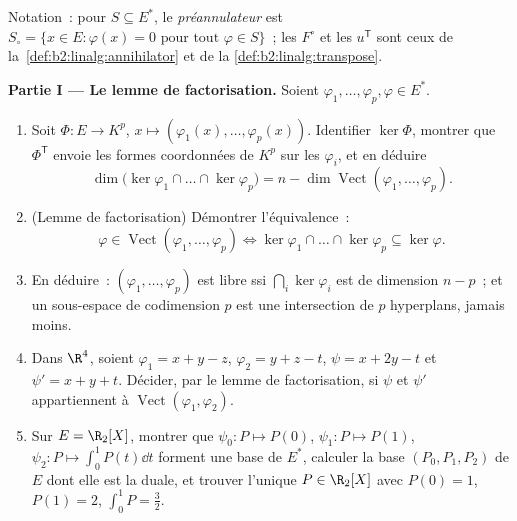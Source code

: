 \begin{problem}
\label{pb:b2:linalg:1}
Notation~: pour $S \subseteq E^*$, le \emph{préannulateur} est
$S_\circ = \{x \in E : \varphi(x) = 0 \text{ pour tout } \varphi
\in S\}$~; les  $F^\circ$ et les  $u^{\mathsf T}$
sont ceux de la~\cref{def:b2:linalg:annihilator} et de la
\cref{def:b2:linalg:transpose}.

\medskip
\noindent\textbf{Partie I --- Le lemme de factorisation.} Soient
$\varphi_1, \dots, \varphi_p, \varphi \in E^*$.
\begin{enumerate}
  \item Soit $\Phi \colon E \to K^p$, $x \mapsto (\varphi_1(x),
        \dots, \varphi_p(x))$. Identifier $\ker\Phi$, montrer que
        $\Phi^{\mathsf T}$ envoie les formes coordonnées de $K^p$ sur
        les $\varphi_i$, et en déduire
        \[
        \dim \bigl(\ker\varphi_1 \cap \dots \cap
        \ker\varphi_p\bigr) = n - \dim
        \operatorname{Vect}(\varphi_1, \dots, \varphi_p).
        \]
  \item (Lemme de factorisation) Démontrer l'équivalence~:
        \[
        \varphi \in \operatorname{Vect}(\varphi_1, \dots,
        \varphi_p)
        \iff
        \ker\varphi_1 \cap \dots \cap \ker\varphi_p \subseteq
        \ker\varphi .
        \]
  \item En déduire~: $(\varphi_1, \dots, \varphi_p)$ est libre ssi
        $\bigcap_i \ker\varphi_i$ est de dimension $n - p$~; et un
        sous-espace de codimension $p$ est une intersection de $p$
        hyperplans, jamais moins.
  \item Dans $\R^4$, soient $\varphi_1 = x + y - z$, $\varphi_2 = y +
        z - t$, $\psi = x + 2y - t$ et $\psi' = x + y + t$.
        Décider, par le lemme de factorisation, si $\psi$ et
        $\psi'$ appartiennent à $\operatorname{Vect}(\varphi_1,
        \varphi_2)$.
  \item Sur $E = \R_2[X]$, montrer que $\psi_0 \colon P \mapsto
        P(0)$, $\psi_1 \colon P \mapsto P(1)$, $\psi_2 \colon P
        \mapsto \int_0^1 P(t)\dd t$ forment une base de $E^*$,
        calculer la base $(P_0, P_1, P_2)$ de $E$ dont elle est
        la duale, et trouver l'unique $P \in \R_2[X]$ avec $P(0)
        = 1$, $P(1) = 2$, $\int_0^1 P = \frac32$.
\end{enumerate}


\end{problem}
